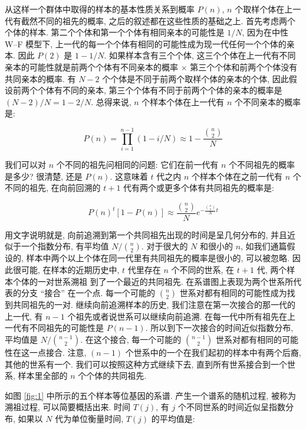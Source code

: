 \documentclass[12pt]{article}
\begin{document}
从这样一个群体中取得的样本的基本性质关系到概率 $P(n)$, $n$ 个取样个体在上一代有截然不同的祖先的概率,
之后的叙述都在这些性质的基础之上. 首先考虑两个个体的样本. 第二个个体和第一个个体有相同亲本的可能性是 $1/N$, 因为在中性
W--F 模型下, 上一代的每一个个体有相同的可能性成为现一代任何一个个体的亲本. 因此 $P(2)$ 是 $1-1/N$.
如果样本含有三个个体, 这三个个体在上一代有不同亲本的可能性就是前两个个体有不同亲本的概率 $\times$
第三个个体和前两个个体没有共同亲本的概率. 有 $N-2$ 个个体是不同于前两个取样个体的亲本的个体,
因此假设前两个个体有不同的亲本, 第三个个体有不同于前两个个体的亲本的概率是 $(N-2)/N=1-2/N$. 总得来说, $n$
个样本个体在上一代有 $n$ 个不同亲本的概率是:

\begin{equation} \label{eq:3}
    P(n) = \prod_{i=1}^{n-1}(1-i/N) \approx 1-\frac{\binom{n}{2}}{N}
\end{equation}

我们可以对 $n$ 个不同的祖先问相同的问题: 它们在前一代有 $n$ 个不同祖先的概率是多少? 很清楚, 还是 $P(n)$. 这意味着 $t$
代之内 $n$ 个样本个体在之前一代有 $n$ 个不同的祖先, 在向前回溯的 $t+1$ 代有两个或更多个体有共同祖先的概率是:

\begin{equation} \label{eq:4}
    P(n)^{t}[1-P(n)] \approx \frac{\binom{n}{2}}{N} e^{-\frac{\binom{n}{2}}{N}t}
\end{equation}

用文字说明就是, 向前追溯到第一个共同祖先出现的时间是呈几何分布的, 并且近似于一个指数分布, 有平均值 $N/\binom{n}{2}$.
对于很大的 $N$ 和很小的 $n$, 如我们通篇假设的, 样本中两个以上个体在同一代里有共同祖先的概率是很小的, 可以被忽略.
因此很可能, 在样本的近期历史中, $t$ 代里存在 $n$ 个不同的世系, 在 $t+1$ 代, 两个样本个体的一对世系溯祖
到了一个最近的共同祖先. 在系谱图上表现为两个世系所代表的分支 ``接合'' 在一个点. 每一个可能的 $\binom{n}{2}$
世系对都有相同的可能性成为找到共同祖先的一对. 继续向前追溯样本的历史, 我们注意在第一次接合的那一代的上一代, 有 $n-1$
个祖先或者说世系可以继续向前追溯. 在每一代中所有祖先在上一代有不同祖先的可能性是 $P(n-1)$.
所以到下一次接合的时间近似指数分布, 平均值是 $N/\binom{n-1}{2}$. 在这个接合, 每一个可能的 $\binom{n-1}{2}$
世系对都有相同的可能性在这一点接合. 注意, $(n-1)$ 个世系中的一个在我们起初的样本中有两个后裔, 其他的世系有一个.
我们可以按照这种方式继续下去, 直到所有世系接合到一个世系, 样本里全部的 $n$ 个个体的共同祖先.

如图 \ref{fig:1} 中所示的五个样本等位基因的系谱. 产生一个谱系的随机过程, 被称为溯祖过程, 可以简要概括出来. 时间
$T(j)$, 有 $j$ 个不同世系的时间近似呈指数分布, 如果以 $N$ 代为单位衡量时间, $T(j)$ 的平均值是:
\end{document}
